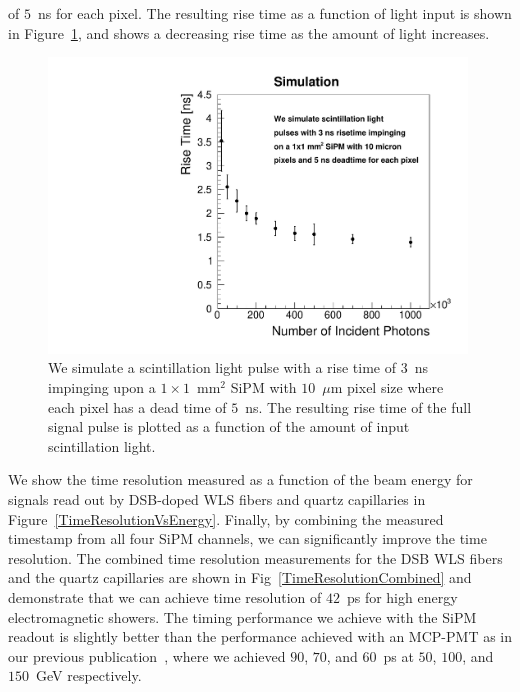 of $5$~ns for each pixel. The resulting rise time as a function
of light input is shown in Figure~\ref{RiseTimeSimulation}, and shows a 
decreasing rise time as the amount of light increases.

\begin{figure}[!htb]
\centering
\includegraphics[width=0.99\textwidth]{figures/RisetimeSimulation.pdf}
\caption{\label{RiseTimeSimulation} We simulate a scintillation light pulse 
with a rise time of $3$~ns impinging upon a $1\times1$~$\mathrm{mm}^{2}$ 
SiPM with $10$~$\mu$m pixel size where each pixel has a dead time 
of $5$~ns. The resulting rise time of the full signal pulse is plotted as a function
of the amount of input scintillation light.}
\end{figure}

We show the time resolution measured as a function of the beam energy for
signals read out by DSB-doped WLS fibers and quartz capillaries in
Figure~\ref{TimeResolutionVsEnergy}. Finally, by combining the measured
timestamp from all four SiPM channels, we can significantly improve the time
resolution. The combined time resolution measurements for the DSB WLS fibers and
the quartz capillaries are shown in Fig~\ref{TimeResolutionCombined} and
demonstrate that we can achieve time resolution of $42$~ps for high energy
electromagnetic showers. The timing performance we achieve with the SiPM readout
is slightly better than the performance achieved with an MCP-PMT as in our
previous publication~\cite{Anderson:2015gha}, where we achieved $90$, $70$, and
$60$~ps at $50$, $100$, and $150$~GeV  respectively. 


